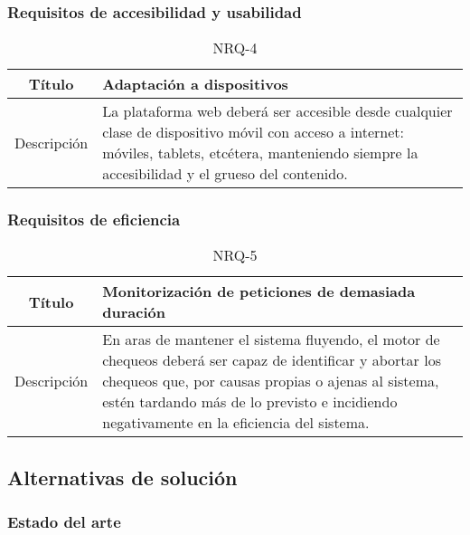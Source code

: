\FloatBarrier
\subsubsection{Requisitos de accesibilidad y usabilidad}

\begin{table}[h!]
  \centering
  \begin{tabularx}{\textwidth}{|c|X|}
    \hline
    Título & Adaptación a dispositivos \\

    \hline

    Descripción & La plataforma web deberá ser accesible desde cualquier clase
    de dispositivo móvil con acceso a internet: móviles, tablets, etcétera,
    manteniendo siempre la accesibilidad y el grueso del contenido. \\

    \hline
  \end{tabularx}
  \label{tab:accesibilidad}
  \caption{NRQ-4}
\end{table}


\FloatBarrier
\subsubsection{Requisitos de eficiencia}

\begin{table}[H]
  \centering
  \begin{tabularx}{\textwidth}{|c|X|}
    \hline
    Título & Monitorización de peticiones de demasiada duración \\

    \hline

    Descripción & En aras de mantener el sistema fluyendo, el motor de chequeos
    deberá ser capaz de identificar y abortar los chequeos que, por causas
    propias o ajenas al sistema, estén tardando más de lo previsto e incidiendo
    negativamente en la eficiencia del sistema. \\

    \hline
  \end{tabularx}
  \caption{NRQ-5}
\end{table}

\subsection{Alternativas de solución}
\label{sec:alternativas-solucion}

\subsubsection{Estado del arte}

